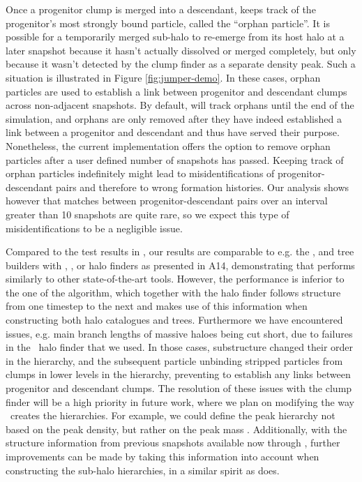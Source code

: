 Once a progenitor  clump is merged into  a descendant, \acacia
keeps track of the progenitor's most strongly bound particle, called the
``orphan particle''.  It is possible for a temporarily merged sub-halo
to re-emerge from its host halo  at a later snapshot because it hasn't
actually dissolved  or merged completely,  but only because  it wasn't
detected  by the  clump finder  as a  separate density  peak.  Such  a
situation  is illustrated  in Figure  \ref{fig:jumper-demo}. In  these
cases,  orphan  particles  are  used   to  establish  a  link  between
progenitor  and  descendant   clumps  across  non-adjacent  snapshots.
By  default, \acacia will track orphans until the end of the
simulation, and orphans are only removed after they have indeed established
a link between a progenitor and descendant and thus have served their
purpose. Nonetheless, the current implementation
offers the option to remove orphan particles after a user defined number
of snapshots has passed. Keeping track of orphan particles indefinitely
might lead to misidentifications of progenitor-descendant pairs and
therefore to wrong formation histories. Our analysis shows however that
matches between progenitor-descendant pairs over an interval greater
than 10 snapshots are quite rare, so we expect this type of
misidentifications to be a negligible issue.

Compared to the test results in \citet{SUSSING_HALOFINDER}, our results
are comparable to e.g. the ,  and
 tree builders with , ,
or  halo finders as presented in A14, demonstrating that
\acacia performs similarly to other state-of-the-art tools.
However, the performance is inferior to the one of the 
algorithm, which together with the  halo finder follows
structure from one timestep to the next and makes use of this information
when constructing both halo catalogues and trees. Furthermore we have encountered issues, e.g. main branch lengths of massive haloes being cut
short, due to failures in the \phew\ halo finder that we used. In those
cases, substructure changed their order in the hierarchy, and the subsequent
particle unbinding stripped particles from clumps in lower levels in the
hierarchy, preventing \acacia to establish any links between
progenitor and descendant clumps. The resolution of these issues with the
clump finder will be a high priority in future work, where we plan on
modifying the way \phew\ creates the hierarchies.
For example, we could define the peak hierarchy not based on the peak
density, but rather on the peak mass \citep[e.g. similarly to
,][]{aubertOriginImplicationsDark2004}. Additionally,
with the structure information from previous snapshots available now through
\acacia, further improvements can be made by taking this information
into account when constructing the sub-halo hierarchies, in a similar spirit
as  does.

